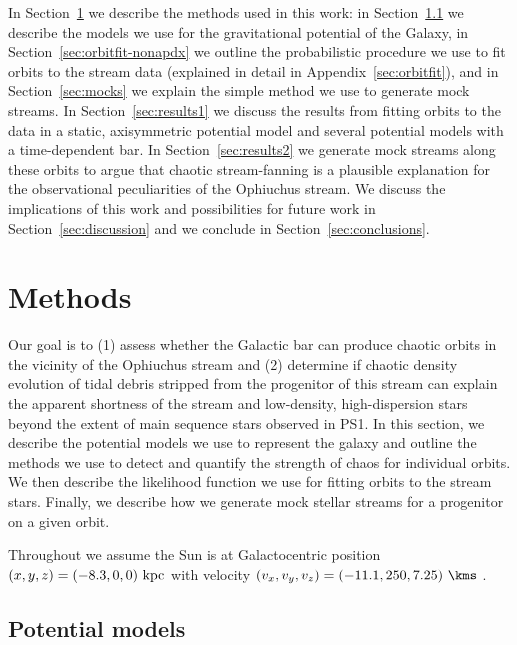 \documentclass[letterpaper,12pt,preprint]{aastex}
\begin{document}
In Section~\ref{sec:method} we describe the methods used in this work: in Section~\ref{sec:potential} we describe the models we use for the gravitational potential of the Galaxy, in Section~\ref{sec:orbitfit-nonapdx} we outline the probabilistic procedure we use to fit orbits to the stream data (explained in detail in Appendix~\ref{sec:orbitfit}), and in Section~\ref{sec:mocks} we explain the simple method we use to generate mock streams. In Section~\ref{sec:results1} we discuss the results from fitting orbits to the data in a static, axisymmetric potential model and several potential models with a time-dependent bar. In Section~\ref{sec:results2} we generate mock streams along these orbits to argue that chaotic stream-fanning is a plausible explanation for the observational peculiarities of the Ophiuchus stream. We discuss the implications of this work and possibilities for future work in Section~\ref{sec:discussion} and we conclude in Section~\ref{sec:conclusions}.

\section{Methods}\label{sec:method}

Our goal is to (1) assess whether the Galactic bar can produce chaotic orbits in the vicinity of the Ophiuchus stream and (2) determine if chaotic density evolution of tidal debris stripped from the progenitor of this stream can explain the apparent shortness of the stream and low-density, high-dispersion stars beyond the extent of main sequence stars observed in PS1. In this section, we describe the potential models we use to represent the galaxy and outline the methods we use to detect and quantify the strength of chaos for individual orbits. We then describe the likelihood function we use for fitting orbits to the stream stars. Finally, we describe how we generate mock stellar streams for a progenitor on a given orbit.

Throughout we assume the Sun is at Galactocentric position $(x,y,z) = (-8.3,0,0)~{\rm kpc}$ \citep[e.g.,][]{schoenrich12} with velocity $(v_x,v_y,v_z) = (-11.1, 250, 7.25)~\kms$ \citep[e.g.,][]{schoenrich10, schoenrich12}.

\subsection{Potential models}\label{sec:potential}
\end{document}
